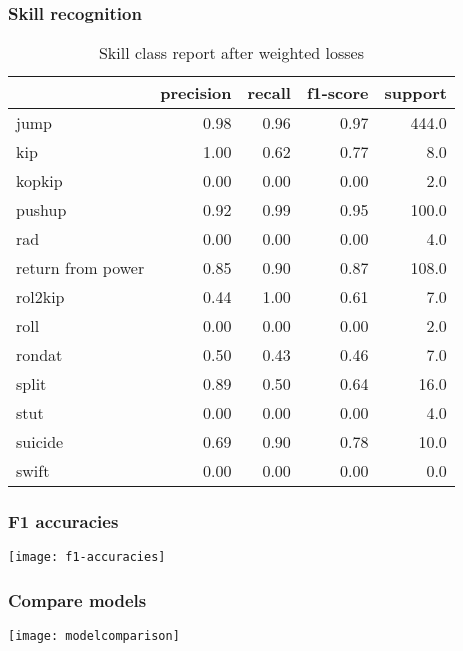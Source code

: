 \documentclass[aspectratio=169]{beamer}
\begin{document}
\begin{frame}
  \frametitle{Skill recognition}

  \begin{table}[h!]
    \begin{tabular}{|l|r|r|r|r|}
                \hline       & precision & recall  & f1-score &  support \\ \hline
                        jump  &     0.98 &    0.96  &    0.97  &   444.0 \\
                         kip  &     1.00 &    0.62  &    0.77  &     8.0 \\
                      kopkip  &     0.00 &    0.00  &    0.00  &     2.0 \\
                      pushup  &     0.92 &    0.99  &    0.95  &   100.0 \\
                         rad  &     0.00 &    0.00  &    0.00  &     4.0 \\
           return from power  &     0.85 &    0.90  &    0.87  &   108.0 \\
                     rol2kip  &     0.44 &    1.00  &    0.61  &     7.0 \\
                        roll  &     0.00 &    0.00  &    0.00  &     2.0 \\
                      rondat  &     0.50 &    0.43  &    0.46  &     7.0 \\
                       split  &     0.89 &    0.50  &    0.64  &    16.0 \\
                        stut  &     0.00 &    0.00  &    0.00  &     4.0 \\
                     suicide  &     0.69 &    0.90  &    0.78  &    10.0 \\
                       swift  &     0.00 &    0.00  &    0.00  &     0.0 \\
            \hline
    \end{tabular}
    \caption[Skill class report after weighted losses 2]{Skill class report after weighted losses}
    \label{tbl:mvit-class-reports-skills-after-weighted-losses}
  \end{table}

\end{frame}

\begin{frame}
  \frametitle{F1 accuracies}
  \texttt{[image: f1-accuracies]}
\end{frame}

\begin{frame}
  \frametitle{Compare models}
  \texttt{[image: modelcomparison]}
\end{frame}
\end{document}
